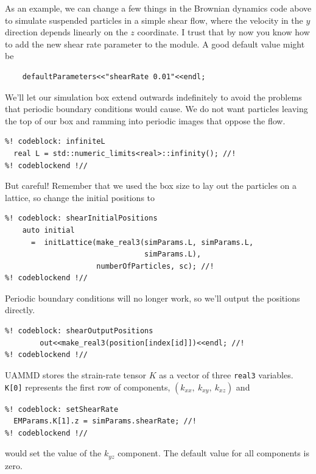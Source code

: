 As an example, we can change a few things in the Brownian dynamics code above to 
simulate suspended particles in a simple shear flow, where the velocity in the 
$y$ direction depends linearly on the $z$ coordinate. I trust that by now you 
know how to add the new shear rate parameter to the module. A good default value 
might be
\begin{lstlisting}
    defaultParameters<<"shearRate 0.01"<<endl;
\end{lstlisting}
We'll let our simulation box extend outwards indefinitely to avoid the problems 
that periodic boundary conditions would cause. We do not want particles leaving 
the top of our box and ramming into periodic images that oppose the flow.
\begin{lstlisting}
%! codeblock: infiniteL
  real L = std::numeric_limits<real>::infinity(); //!
%! codeblockend !//
\end{lstlisting}
But careful! Remember that we used the box size to lay out the particles on a 
lattice, so change the initial positions to
\begin{lstlisting}
%! codeblock: shearInitialPositions
    auto initial
      =  initLattice(make_real3(simParams.L, simParams.L,
                                simParams.L),
                     numberOfParticles, sc); //!
%! codeblockend !//
\end{lstlisting}
Periodic boundary conditions will no longer work, so we'll output the positions 
directly.
\begin{lstlisting}
%! codeblock: shearOutputPositions
        out<<make_real3(position[index[id]])<<endl; //!
%! codeblockend !//
\end{lstlisting}

UAMMD stores the strain-rate tensor $K$ as a vector of three \texttt{real3} 
variables. \texttt{K[0]} represents the first row of components,
$(k_{xx},\ k_{xy},\ k_{xz})$ and
\begin{lstlisting}
%! codeblock: setShearRate
  EMParams.K[1].z = simParams.shearRate; //!
%! codeblockend !//
\end{lstlisting}
would set the value of the $k_{yz}$ component. The default value for all 
components is zero.

